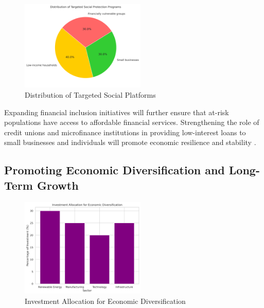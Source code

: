 \begin{figure}[h]     
     \centering
     \includegraphics[width=0.53\textwidth]{support.png}
     \caption{Distribution of Targeted Social Platforms}
     \label{fig:graph_1}
\end{figure}

Expanding financial inclusion initiatives will further ensure that 
at-risk populations have access to affordable financial services. Strengthening the 
role of credit unions and microfinance institutions in providing low-interest loans to 
small businesses and individuals will promote economic resilience and stability \textcolor{orange}{\cite{worldbank2023}}.

\subsection*{Promoting Economic Diversification and Long-Term Growth}

\begin{figure}[h]     
     \centering
     \includegraphics[width=0.53\textwidth]{diversification.png}
     \caption{Investment Allocation for Economic Diversification}
     \label{fig:graph_1}
\end{figure}


